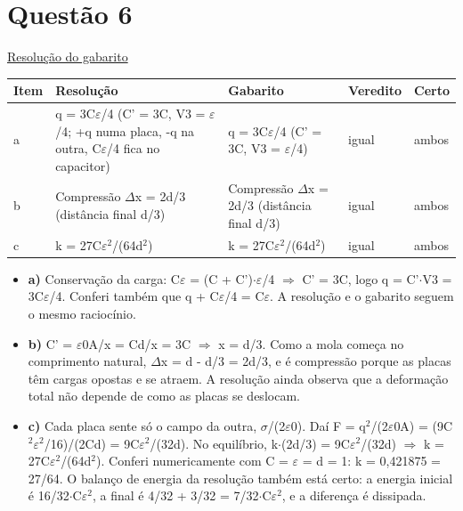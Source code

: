 \documentclass{article}%
\begin{document}
\section*{Questão 6}%
\href{https://poliedroresolve.sistemapoliedro.com.br/vestibulares/ita/2027/ita-2-fase-dia-3-22-10-2026-2-fase-dia-3/dissertativa-6-fisica-2-fase-dia-3-ita-2027}{Resolução do gabarito}\par\smallskip%
\begin{longtable}{@{}p{} p{} p{} p{} p{}@{}}\toprule Item & Resolução & Gabarito & Veredito & Certo \\ \midrule
a & q = 3C$\varepsilon$/4 (C' = 3C, V3 = $\varepsilon$/4; +q numa placa, -q na outra, C$\varepsilon$/4 fica no capacitor) & q = 3C$\varepsilon$/4 (C' = 3C, V3 = $\varepsilon$/4) & igual & ambos \\
b & Compressão $\Delta$x = 2d/3 (distância final d/3) & Compressão $\Delta$x = 2d/3 (distância final d/3) & igual & ambos \\
c & k = 27C$\varepsilon$$^2$/(64d$^2$) & k = 27C$\varepsilon$$^2$/(64d$^2$) & igual & ambos \\
\bottomrule\end{longtable}%
\begin{itemize}%
\item%
\textbf{a)} Conservação da carga: C$\varepsilon$ = (C + C')$\cdot$$\varepsilon$/4 $\Rightarrow$ C' = 3C, logo q = C'$\cdot$V3 = 3C$\varepsilon$/4. Conferi também que q + C$\varepsilon$/4 = C$\varepsilon$. A resolução e o gabarito seguem o mesmo raciocínio.%
\item%
\textbf{b)} C' = $\varepsilon$0A/x = Cd/x = 3C $\Rightarrow$ x = d/3. Como a mola começa no comprimento natural, $\Delta$x = d - d/3 = 2d/3, e é compressão porque as placas têm cargas opostas e se atraem. A resolução ainda observa que a deformação total não depende de como as placas se deslocam.%
\item%
\textbf{c)} Cada placa sente só o campo da outra, $\sigma$/(2$\varepsilon$0). Daí F = q$^2$/(2$\varepsilon$0A) = (9C$^2$$\varepsilon$$^2$/16)/(2Cd) = 9C$\varepsilon$$^2$/(32d). No equilíbrio, k$\cdot$(2d/3) = 9C$\varepsilon$$^2$/(32d) $\Rightarrow$ k = 27C$\varepsilon$$^2$/(64d$^2$). Conferi numericamente com C = $\varepsilon$ = d = 1: k = 0,421875 = 27/64. O balanço de energia da resolução também está certo: a energia inicial é 16/32$\cdot$C$\varepsilon$$^2$, a final é 4/32 + 3/32 = 7/32$\cdot$C$\varepsilon$$^2$, e a diferença é dissipada.%
\end{itemize}%
\end{document}

